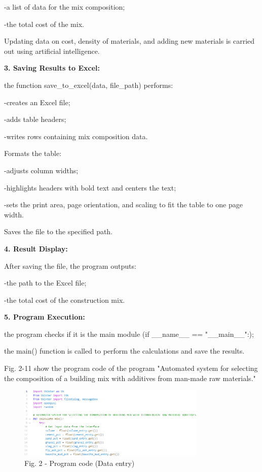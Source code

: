 \begin{multicols}{2}
-a list of data for the mix composition;

-the total cost of the mix.

Updating data on cost, density of materials, and adding new materials is
carried out using artificial intelligence.

{\bfseries 3. Saving Results to Excel:}

the function save\_to\_excel(data, file\_path) performs:

-creates an Excel file;

-adds table headers;

-writes rows containing mix composition data.

Formats the table:

-adjusts column widths;

-highlights headers with bold text and centers the text;

-sets the print area, page orientation, and scaling to fit the table to
one page width.

Saves the file to the specified path.

{\bfseries 4. Result Display:}

After saving the file, the program outputs:

-the path to the Excel file;

-the total cost of the construction mix.

{\bfseries 5. Program Execution:}

the program checks if it is the main module (if \_\_name\_\_ ==
"\_\_main\_\_":);

the main() function is called to perform the calculations and save the
results.

Fig. 2-11 show the program code of the program "Automated system for
selecting the composition of a building mix with additives from man-made
raw materials."
\end{multicols}

\begin{figure}[H]
	\includegraphics[width=0.8\textwidth]{media/ict3/image3}
	\caption*{Fig. 2 - Program code (Data entry)}
\end{figure}

